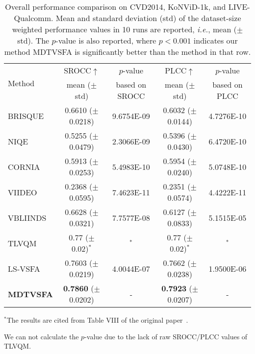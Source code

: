 \documentclass[twocolumn]{svjour3}          \smartqed  \usepackage{graphicx}
\begin{document}
\begin{table*}[!hbt]
    \centering
    \caption{Overall performance comparison on CVD2014, KoNViD-1k, and LIVE-Qualcomm. Mean and standard deviation (std) of the dataset-size weighted performance values in 10 runs are reported, \textit{i.e.}, mean ($\pm$ std). The $p$-value is also reported, where $p<0.001$ indicates our method MDTVSFA is significantly better than the method in that row.}
    \label{tab:overall performance}

    \begin{small}
    
\begin{tabular}{lcccc}
    \toprule
     \multirow{2}{*}{Method} & SROCC$\uparrow$ & $p$-value & PLCC$\uparrow$ & $p$-value\\
     & mean ($\pm$ std) & based on SROCC & mean ($\pm$ std) & based on PLCC \\
    \midrule
    BRISQUE~\citep{mittal2012no} & 0.6610 ($\pm$ 0.0218) & 9.6754E-09 & 0.6032 ($\pm$ 0.0144) & 4.7276E-10\\
    NIQE~\citep{mittal2013making} & 0.5255 ($\pm$ 0.0479)  & 2.3066E-09 & 0.5396 ($\pm$ 0.0430) & 6.4720E-10 \\
    CORNIA~\citep{ye2012unsupervised} &  0.5913 ($\pm$ 0.0253) & 5.4983E-10 & 0.5954 ($\pm$ 0.0240) & 5.0748E-10\\
    VIIDEO~\citep{mittal2016completely} &  0.2368 ($\pm$ 0.0595) & 7.4623E-11 & 0.2351 ($\pm$ 0.0574) & 4.4222E-11 \\
    VBLIINDS~\citep{saad2014blind} &  0.6628 ($\pm$ 0.0321) & 7.7577E-08 & 0.6127 ($\pm$ 0.0833) & 5.1515E-05 \\
    TLVQM~\citep{korhonen2019two} & 0.77 ($\pm$ 0.02)$^*$ & $^*$ & 0.77 ($\pm$ 0.02)$^*$ & $^*$\\
    \midrule
    LS-VSFA &  0.7603 ($\pm$ 0.0219) & 4.0044E-07 &  0.7662 ($\pm$ 0.0238) & 1.9500E-06 \\
    \textbf{MDTVSFA} & \textbf{0.7860} ($\pm$ 0.0202) & - & \textbf{0.7923} ($\pm$ 0.0207) & -\\
    \bottomrule
    \end{tabular}
\vspace{1mm}
    
    $^*$The results are cited from Table VIII of the original paper~\citep{korhonen2019two}. 
    
    We can not calculate the $p$-value due to the lack of raw SROCC/PLCC values of TLVQM.
    \end{small}
\end{table*}
\end{document}
